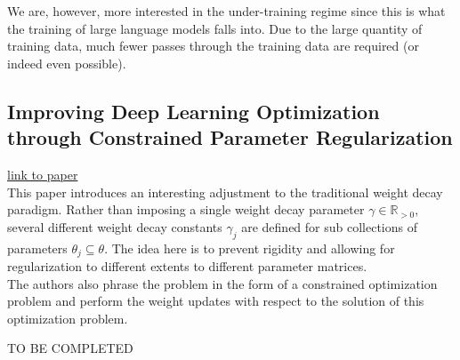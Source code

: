 \documentclass[12pt]{book}
\newcommand{\R}{\mathbb{R}}
\begin{document}
We are, however, more interested in the under-training regime since this is what the training of large language models falls into. Due to the large quantity of training data, much fewer passes through the training data are required (or indeed even possible).
\subsection*{Improving Deep Learning Optimization through
Constrained Parameter Regularization}
\href{https://openreview.net/pdf?id=rCXTkIhkbF}{link to paper}\\
This paper introduces an interesting adjustment to the traditional weight decay paradigm. Rather than imposing a single weight decay parameter $\gamma \in \R_{>0}$, several different weight decay constants $\gamma_j$ are defined for sub collections of parameters $\theta_j \subseteq \theta$. The idea here is to prevent rigidity and allowing for regularization to different extents to different parameter matrices. \\
The authors also phrase the problem in the form of a constrained optimization problem and perform the weight updates with respect to the solution of this optimization problem. 

TO BE COMPLETED
\end{document}
